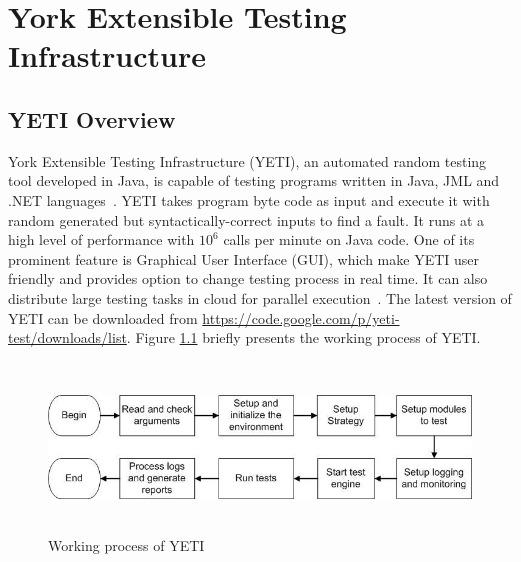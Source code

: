 \chapter{York Extensible Testing Infrastructure}
\label{chap:randomTesting}



\newpage

\section{YETI Overview}
York Extensible Testing Infrastructure (YETI), an automated random testing tool developed in Java, is capable of testing programs written in Java, JML and .NET languages~\cite{Oriol2010c}. YETI takes program byte code as input and execute it with random generated but syntactically-correct inputs to find a fault. It runs at a high level of performance with $10^6$ calls per minute on Java code. One of its prominent feature is Graphical User Interface (GUI), which make YETI user friendly and provides option to change testing process in real time. It can also distribute large testing tasks in cloud for parallel execution~\cite{Oriol2010}. The latest version of YETI can be downloaded from \url{https://code.google.com/p/yeti-test/downloads/list}. Figure \ref{fig:yetiOverview} briefly presents the working process of YETI. 
\\

\begin{figure}[h]
	\centering
	\includegraphics[width=15cm, height=4.5cm]{chapter3/yetiOverview.png}
	\caption{Working process of YETI}
	\label{fig:yetiOverview}
\end{figure}


